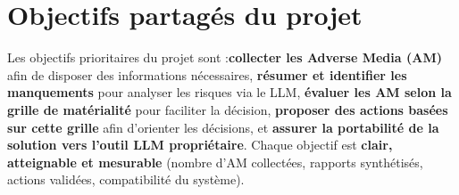 \section{Objectifs partagés du projet}
Les objectifs prioritaires du projet sont :\textbf{collecter les Adverse Media (AM)} afin de disposer des informations nécessaires, \textbf{résumer et identifier les manquements} pour analyser les risques via le LLM, \textbf{évaluer les AM selon la grille de matérialité} pour faciliter la décision, \textbf{proposer des actions basées sur cette grille} afin d’orienter les décisions, et \textbf{assurer la portabilité de la solution vers l’outil LLM propriétaire}. Chaque objectif est \textbf{clair, atteignable et mesurable} (nombre d’AM collectées, rapports synthétisés, actions validées, compatibilité du système).
